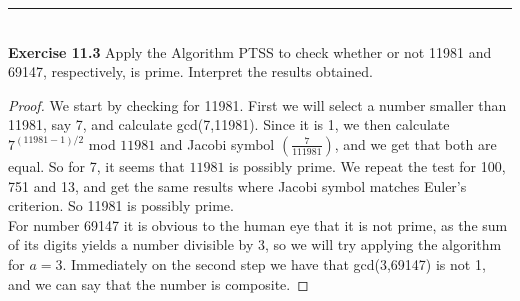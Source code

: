\documentclass[a4paper]{article}
\begin{document}
\noindent\rule{12cm}{0.4pt}\\
\noindent \textbf{Exercise 11.3} Apply the Algorithm PTSS to check whether or not 11981 and 69147, respectively, is prime. Interpret the results obtained.
\begin{proof}
We start by checking for 11981. First we will select a number smaller than 11981, say 7, and calculate gcd(7,11981). Since it is 1, we then calculate $7^{(11981-1)/2}$ mod $11981$ and Jacobi symbol $\left(\frac{7}{111981}\right)$, and we get that both are equal. So for 7, it seems that $11981$ is possibly prime. We repeat the test for 100, 751 and 13, and get the same results where Jacobi symbol matches Euler's criterion. So 11981 is possibly prime.\\
For number 69147 it is obvious to the human eye that it is not prime, as the sum of its digits yields a number divisible by 3, so we will try applying the algorithm for $a=3$. Immediately on the second step we have that gcd(3,69147) is not 1, and we can say that the number is composite.
\end{proof}
\end{document}
